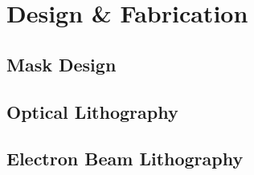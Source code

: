 \chapter{Design \& Fabrication}

\section{Mask Design}

\section{Optical Lithography}

\section{Electron Beam Lithography}

\cite{Dewes:arXiv0809.1346}
